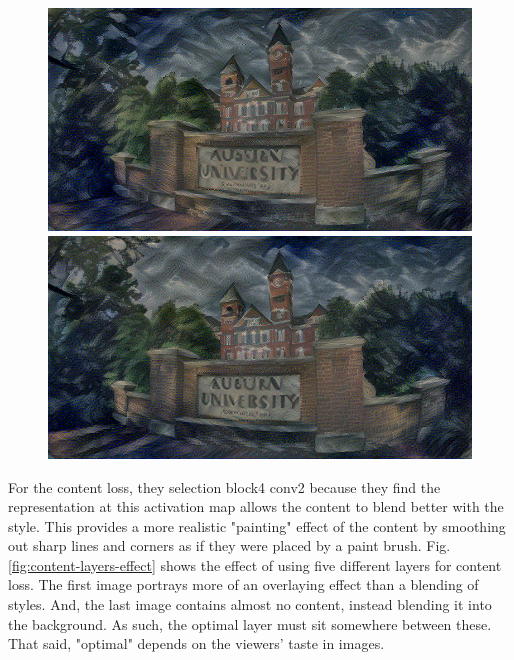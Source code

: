 \documentclass{article}
\begin{document}
\begin{figure}[htp]
\medskip

    \begin{minipage}{0.3\linewidth}
    \includegraphics[width=\textwidth]{img/style-layer-selection/block4_conv1}
    \end{minipage}
    \begin{minipage}{0.3\linewidth}
    \includegraphics[width=\textwidth]{img/style-layer-selection/block5_conv1}
    \end{minipage}

\end{figure}

For the content loss, they selection block4 conv2 because they find the
representation at this activation map allows the content to blend better with
the style. This provides a more realistic "painting" effect of the content by
smoothing out sharp lines and corners as if they were placed by a paint brush.
Fig. \ref{fig:content-layers-effect} shows the effect of using five different
layers for content loss. The first image portrays more of an overlaying effect
than a blending of styles. And, the last image contains almost no content,
instead blending it into the background. As such, the optimal layer must sit
somewhere between these. That said, "optimal" depends on the viewers' taste in
images.
\end{document}
